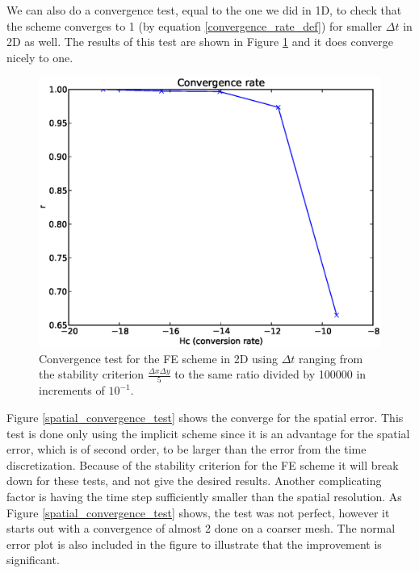 We can also do a convergence test, equal to the one we did in 1D, to check that the scheme converges to 1 (by equation \eqref{convergence_rate_def}) for smaller $\Delta t$ in 2D as well. 
The results of this test are shown in Figure \ref{convergence_test_FE_2d} and it does converge nicely to one.

\begin{figure}[H]
\centering
\includegraphics[scale=0.7]{../doc/results/experiment_29112013_1709/results/ConvergenceTest.eps}
\caption[Convergence test FE 2D]{Convergence test for the FE scheme in 2D using $\Delta t$ ranging from the stability criterion $\frac{\Delta x\Delta y}{5}$ to the same ratio divided by 100000 in increments of $10^{-1}$.}
\label{convergence_test_FE_2d}
\end{figure}

Figure \ref{spatial_convergence_test} shows the converge for the spatial error. 
This test is done only using the implicit scheme since it is an advantage for the spatial error, which is of second order, to be larger than the error from the time discretization. 
Because of the stability criterion for the FE scheme it will break down for these tests, and not give the desired results. 
Another complicating factor is having the time step sufficiently smaller than the spatial resolution. 
As Figure \ref{spatial_convergence_test} shows, the test was not perfect, however it starts out with a convergence of almost 2 done on a coarser mesh. 
The normal error plot is also included in the figure to illustrate that the improvement is significant. 

